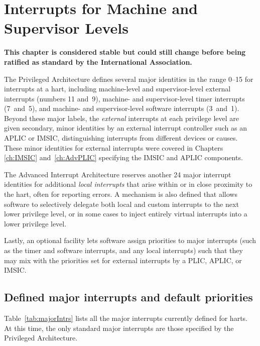 
\chapter{Interrupts for Machine and Supervisor Levels}
\label{ch:MSLevel}

\textbf{%
This chapter is considered stable but could still change before being
ratified as standard by the {\RISCV} International Association.%
}
\bigskip

The {\RISCV} Privileged Architecture defines several major identities
in the range 0--15 for interrupts at a hart, including machine-level
and supervisor-level external interrupts (numbers 11 and~9), machine-
and supervisor-level timer interrupts (7~and~5), and machine- and
supervisor-level software interrupts (3~and~1).
Beyond these major labels, the \emph{external} interrupts at each
privilege level are given secondary, minor identities by an external
interrupt controller such as an APLIC or IMSIC, distinguishing interrupts
from different devices or causes.
These minor identities for external interrupts were covered in Chapters
\ref{ch:IMSIC} and~\ref{ch:AdvPLIC} specifying the IMSIC and
APLIC components.

The Advanced Interrupt Architecture reserves another 24 major
interrupt identities for additional \emph{local interrupts}
that arise within or in close proximity to the hart, often for
reporting errors.
A mechanism is also defined that allows software to
selectively delegate both local and custom interrupts to the next lower
privilege level, or in some cases to inject entirely virtual interrupts
into a lower privilege level.

Lastly, an optional facility lets software assign priorities to major
interrupts (such as the timer and software interrupts, and any local
interrupts) such that they may mix with the priorities set for external
interrupts by a PLIC, APLIC, or IMSIC.

\section{Defined major interrupts and default priorities}
\label{sec:majorIntrs}

Table~\ref{tab:majorIntrs} lists all the major interrupts
currently defined for {\RISCV} harts.
At this time, the only standard major interrupts are those
specified by the {\RISCV} Privileged Architecture.

